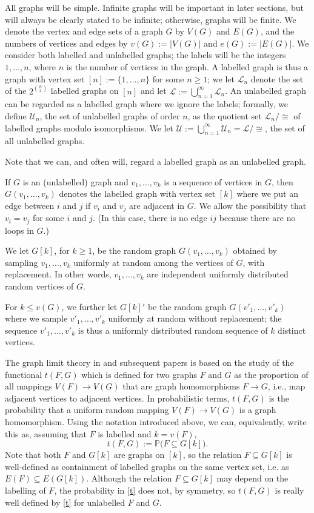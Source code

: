 \documentclass[11pt,reqno,tbtags]{amsart}
\numberwithin{equation}{section}
\theoremstyle{definition}
\theoremstyle{remark}
\newcommand\set[1]{\ensuremath{\{#1\}}}
\newcommand\bigpar[1]{\bigl(#1\bigr)}
\newcommand\ie{i.e.\spacefactor=1000}
\renewcommand\P{\operatorname{\mathbb P{}}}
\newcommand\cL{{\mathcal L}}
\newcommand\cU{{\mathcal U}}
\renewcommand{\=}{:=}
\newcommand{\cupn}{\bigcup_{n=1}^\infty}
\newcommand{\xk}{[k]}
\newcommand{\vvk}{v_1,\dots,v_k}
\newcommand{\vvki}{v'_1,\dots,v'_k}
\begin{document}
All graphs will be simple.
Infinite graphs will be important in later sections, but will always
be clearly stated to be infinite;  otherwise, graphs
will be finite.
We denote the vertex and edge sets of a graph $G$ by $V(G)$ and
$E(G)$, and the numbers of vertices and edges by $v(G)\=|V(G)|$ 
and 
$e(G)\=|E(G)|$. We consider both labelled and unlabelled graphs; the
labels will 
be the integers
$1,\dots,n$, where $n$ is the number of vertices in the graph.
A labelled graph is thus a graph with vertex set
$[n]\=\set{1,\dots,n}$ for some $n\ge1$; we let $\cL_n$ denote the set
of the $2^{\binom n2}$ labelled graphs on $[n]$ and let
$\cL\=\cupn\cL_n$.
An unlabelled graph can be regarded as a labelled graph where we
ignore the labels; formally, we define $\cU_n$, the set of unlabelled
graphs of order $n$, as the quotient set $\cL_n/\cong$ of labelled
graphs modulo isomorphisms.
We let $\cU\=\cupn\cU_n=\cL/\cong$, the set of all unlabelled graphs.

Note that we can, and often will, regard a labelled graph as an
unlabelled graph.

If $G$ is an (unlabelled) graph and $v_1,\dots,v_k$ is a sequence of
vertices in $G$, then $G(v_1,\dots,v_k)$ denotes the labelled graph
with vertex set $[k]$ where we put an edge between $i$ and $j$ if
$v_i$ and $v_j$ are adjacent in $G$. We allow the possibility that
$v_i=v_j$ for some $i$ and $j$. (In this case, there is no edge $ij$
because there are no loops in $G$.)

We let $G\xk$, for $k\ge1$, be the random graph $G(v_1,\dots,v_k)$
obtained by sampling $\vvk$ uniformly at random among the vertices of
$G$, with replacement. In other words, $\vvk$ are independent
uniformly distributed random vertices of $G$.

For $k\le v(G)$, we further let $G\xk'$ be the random graph $G(\vvki)$
where we sample $\vvki$ uniformly at random without replacement; the
sequence $\vvki$ is thus a uniformly distributed random sequence of
$k$ distinct vertices.


The graph limit theory in \cite{LSz} and subsequent papers is based on 
the study of the functional $t(F,G)$ 
which is defined for two graphs $F$ and $G$ as the proportion of all
mappings $V(F)\to V(G)$ that are
graph homomorphisms $F\to G$, \ie, map adjacent vertices to adjacent
vertices.
In probabilistic terms, $t(F,G)$ is the probability that a uniform random 
mapping $V(F)\to V(G)$ is a graph homomorphism.
Using the notation introduced above, we can, equivalently, write this
as, 
assuming that $F$ is labelled and $k=v(F)$,
\begin{equation}
  \label{t}
t(F,G)\=\P\bigpar{F\subseteq G\xk}.
\end{equation}
Note that both $F$ and $G\xk$ are graphs on $\xk$,
so the relation $F\subseteq G\xk$ is well-defined as containment of
labelled graphs on the same vertex set, \ie{} as $E(F)\subseteq E(G\xk)$.
Although the relation $F\subseteq G\xk$ may depend on the
labelling of $F$, the probability in \eqref{t} does not, by symmetry,
so $t(F,G)$ is really well defined by \eqref{t} for unlabelled $F$ and
$G$.
\end{document}
